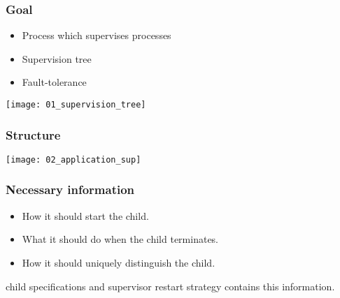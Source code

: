 \begin{frame}
    \frametitle{Goal}
    \begin{itemize}
        \item Process which supervises processes
        \item Supervision tree
        \item Fault-tolerance
    \end{itemize}
    \vfill
    \texttt{[image: 01\_supervision\_tree]}
\end{frame}

\begin{frame}
    \frametitle{Structure}
    \texttt{[image: 02\_application\_sup]}
\end{frame}

\begin{frame}
    \frametitle{Necessary information}
    \begin{itemize}
        \item How it should start the child.
        \item What it should do when the child terminates.
        \item How it should uniquely distinguish the child.
    \end{itemize}
    
    \vfill

    \footnotesize
    child specifications and supervisor restart strategy contains this information.
\end{frame}